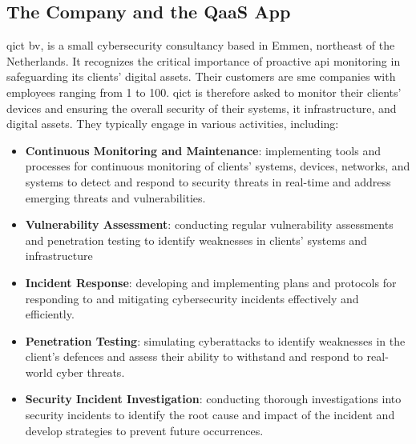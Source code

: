 \begin{multicols}{2}
      \section{The Company and the QaaS App}
      \acrshort{qict} \acrshort{bv}, is a small cybersecurity consultancy based in Emmen, northeast of the
      Netherlands. It recognizes the critical importance of proactive \acrshort{api} monitoring in safeguarding
      its clients' digital assets. Their customers are \acrshort{sme} companies with employees ranging from 1 to 100.
      \acrshort{qict} is therefore asked to monitor their clients' devices and ensuring the overall security of
      their systems, \acrshort{it} infrastructure, and digital assets. They typically engage in various activities,
      including:
      \begin{itemize}
            \item \textbf{Continuous Monitoring and Maintenance}: implementing tools and processes for continuous
                  monitoring of clients' systems, devices, networks, and systems to detect and respond to security
                  threats in real-time and address emerging threats and vulnerabilities.
            \item \textbf{Vulnerability Assessment}: conducting regular vulnerability assessments and penetration
                  testing to identify weaknesses in clients' systems and infrastructure
            \item \textbf{Incident Response}: developing and implementing plans and protocols for responding to
                  and mitigating cybersecurity incidents effectively and efficiently.
            \item \textbf{Penetration Testing}: simulating cyberattacks to identify weaknesses in the client's
                  defences and assess their ability to withstand and respond to real-world cyber threats.
            \item \textbf{Security Incident Investigation}: conducting thorough investigations into security
                  incidents to identify the root cause and impact of the incident and develop strategies to prevent
                  future occurrences.
      \end{itemize}

\end{multicols}
